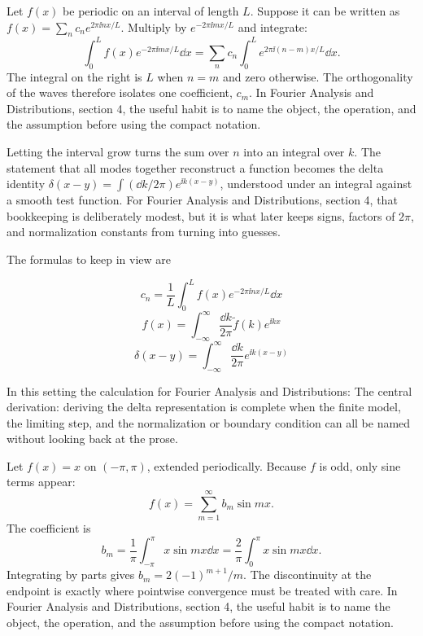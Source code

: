 Let \(f(x)\) be periodic on an interval of length \(L\).  Suppose it can be written as \(f(x)=\sum_n c_ne^{2\pi\ii nx/L}\).  Multiply by \(e^{-2\pi\ii mx/L}\) and integrate:
\[
  \int_0^L f(x)e^{-2\pi\ii mx/L}\dd x
  =
  \sum_n c_n\int_0^L e^{2\pi\ii(n-m)x/L}\dd x.
\]
The integral on the right is \(L\) when \(n=m\) and zero otherwise.  The orthogonality of the waves therefore isolates one coefficient, \(c_m\).  In Fourier Analysis and Distributions, section 4, the useful habit is to name the object, the operation, and the assumption before using the compact notation.

Letting the interval grow turns the sum over \(n\) into an integral over \(k\).  The statement that all modes together reconstruct a function becomes the delta identity \(\delta(x-y)=\int(\dd k/2\pi)e^{\ii k(x-y)}\), understood under an integral against a smooth test function.  For Fourier Analysis and Distributions, section 4, that bookkeeping is deliberately modest, but it is what later keeps signs, factors of \(2\pi\), and normalization constants from turning into guesses.

The formulas to keep in view are

\[
  c_n=\frac1L\int_0^L f(x)e^{-2\pi\ii nx/L}\dd x
\]
\[
  f(x)=\int_{-\infty}^{\infty}\frac{\dd k}{2\pi}\tilde f(k)e^{\ii kx}
\]
\[
  \delta(x-y)=\int_{-\infty}^{\infty}\frac{\dd k}{2\pi}e^{\ii k(x-y)}
\]

In this setting the calculation for Fourier Analysis and Distributions: The central derivation: deriving the delta representation is complete when the finite model, the limiting step, and the normalization or boundary condition can all be named without looking back at the prose.




\begin{example}
Let \(f(x)=x\) on \((-\pi,\pi)\), extended periodically.  Because \(f\) is odd, only sine terms appear:
\[
  f(x)=\sum_{m=1}^\infty b_m\sin mx.
\]
The coefficient is
\[
  b_m=\frac1\pi\int_{-\pi}^\pi x\sin mx\dd x
  =\frac2\pi\int_0^\pi x\sin mx\dd x.
\]
Integrating by parts gives \(b_m=2(-1)^{m+1}/m\).  The discontinuity at the endpoint is exactly where pointwise convergence must be treated with care.  In Fourier Analysis and Distributions, section 4, the useful habit is to name the object, the operation, and the assumption before using the compact notation.
\end{example}




